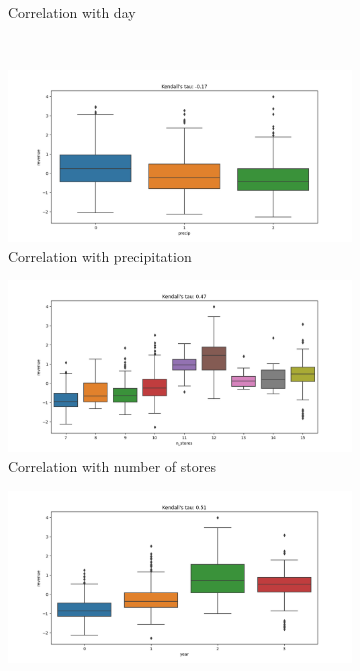 \begin{figure}[h!]
\begin{subfigure}[b]{0.3\textwidth}
        \caption{Correlation with day}
    \end{subfigure}
    ~ %
    \begin{subfigure}[b]{0.3\textwidth}
        \includegraphics[width=\textwidth]{../../preprocessing/plots/precip.png}
        \caption{Correlation with precipitation}
    \end{subfigure}
    \begin{subfigure}[b]{0.3\textwidth}
        \includegraphics[width=\textwidth]{../../preprocessing/plots/n_stores.png}
        \caption{Correlation with number of stores}
    \end{subfigure}
    \begin{subfigure}[b]{0.3\textwidth}
        \includegraphics[width=\textwidth]{../../preprocessing/plots/year.png}

\end{subfigure}
\end{figure}
